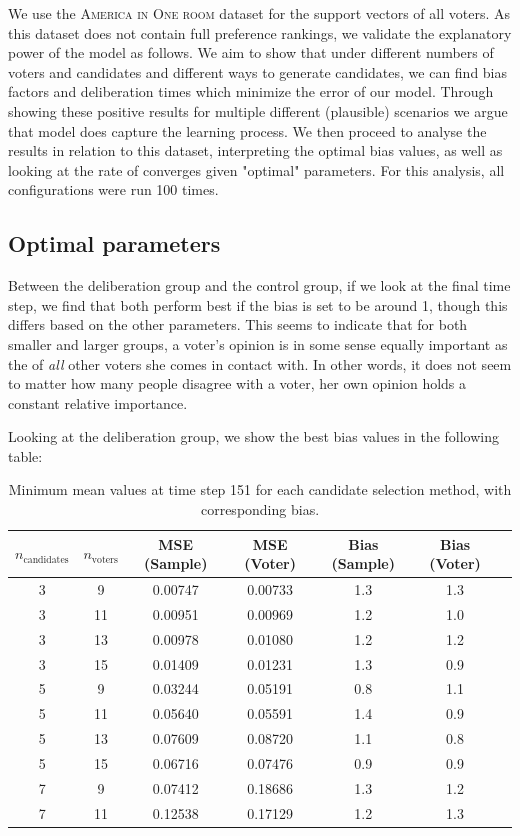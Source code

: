 We use the \textsc{America in One room} dataset
\cite{fishkinCanDeliberationHave2024} for the support vectors of all
voters. As this dataset does not contain full preference rankings, we validate
the explanatory power of the model as follows. We aim to show that under
different numbers of voters and candidates and different ways to generate
candidates, we can find bias factors and deliberation times which minimize the
error of our model. Through showing these positive results for multiple
different (plausible) scenarios we argue that model does capture the learning
process. We then proceed to analyse the results in relation to this dataset,
interpreting the optimal bias values, as well as looking at the rate of
converges given "optimal" parameters. For this analysis, all configurations
were run 100 times.


\subsection{Optimal parameters}

Between the deliberation group and the control group, if we look at the final
time step, we find that both perform best if the bias is set to be around 1,
though this differs based on the other parameters. This seems to indicate that
for both smaller and larger groups, a voter's opinion is in some sense equally
important as the of  \textit{all} other voters she comes in contact with. In
other words, it does not seem to matter how many people disagree with a voter,
her own opinion holds a constant relative importance.

Looking at the deliberation group, we show the best bias values in the following table:
\begin{table}[ht]
\centering
\begin{tabular}{ccccccc}
\toprule
$n_\text{candidates}$ & $n_\text{voters}$ & MSE (Sample) & MSE (Voter) & Bias (Sample) & Bias (Voter) \\
\midrule
3 & 9  & 0.00747 & 0.00733 & 1.3 & 1.3 \\
3 & 11 & 0.00951 & 0.00969 & 1.2 & 1.0 \\
3 & 13 & 0.00978 & 0.01080 & 1.2 & 1.2 \\
3 & 15 & 0.01409 & 0.01231 & 1.3 & 0.9 \\
5 & 9  & 0.03244 & 0.05191 & 0.8 & 1.1 \\
5 & 11 & 0.05640 & 0.05591 & 1.4 & 0.9 \\
5 & 13 & 0.07609 & 0.08720 & 1.1 & 0.8 \\
5 & 15 & 0.06716 & 0.07476 & 0.9 & 0.9 \\
7 & 9  & 0.07412 & 0.18686 & 1.3 & 1.2 \\
7 & 11 & 0.12538 & 0.17129 & 1.2 & 1.3 \\
\bottomrule
\end{tabular}
\caption{Minimum mean values at time step 151 for each candidate selection method, with corresponding bias.}
\label{tab:min_mean_bias_delib}
\end{table}

